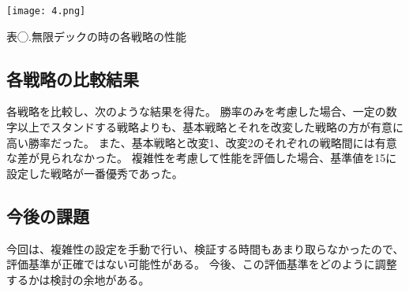 \documentclass{jsarticle}
\begin{document}
\texttt{[image: 4.png]}

表◯.無限デックの時の各戦略の性能

\subsection{各戦略の比較結果}

各戦略を比較し、次のような結果を得た。
勝率のみを考慮した場合、一定の数字以上でスタンドする戦略よりも、基本戦略とそれを改変した戦略の方が有意に高い勝率だった。
また、基本戦略と改変1、改変2のそれぞれの戦略間には有意な差が見られなかった。
複雑性を考慮して性能を評価した場合、基準値を15に設定した戦略が一番優秀であった。

\subsection{今後の課題}

今回は、複雑性の設定を手動で行い、検証する時間もあまり取らなかったので、評価基準が正確ではない可能性がある。
今後、この評価基準をどのように調整するかは検討の余地がある。
\end{document}
